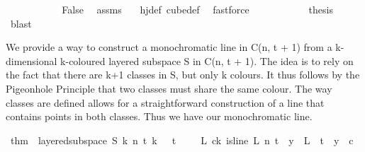 \begin{isabellebody}
\ \ \ \ \ \ \ \ \isamarkupfalse%
\ \isamarkupfalse%
\ False\ \isamarkupfalse%
\ assms\ {}\ \isamarkupfalse%
\ hj{\isacharunderscore}{\kern0pt}def\ cube{\isacharunderscore}{\kern0pt}def\ \isamarkupfalse%
\ fastforce\isanewline
\ \ \ \ \ \ \ \ \isamarkupfalse%
\ \isamarkupfalse%
\ {\isacharquery}{\kern0pt}thesis\ \isamarkupfalse%
\ blast\isanewline
\ \ \ \ \ \ \isamarkupfalse%
\isanewline
\isanewline
\ \ \ \ \isamarkupfalse%
\isanewline
\ \ \isamarkupfalse%
\isanewline
{}\isamarkupfalse%
%
\endisatagproof
{\isafoldproof}%
%
\isadelimproof
%
\endisadelimproof
%
\begin{isamarkuptext}%
We provide a way to construct a monochromatic line in C(n, t + 1) from a k-dimensional k-coloured layered subspace S in C(n, t + 1).
The idea is to rely on the fact that there are k+1 classes in S, but only k colours. It thus follows by the Pigeonhole Principle that two classes must share the same colour. The way classes are defined allows for a straightforward construction of a line that contains points in both classes. Thus we have our monochromatic line.%
\end{isamarkuptext}\isamarkuptrue%
\isamarkupfalse%
\ thm{}{\isacharcolon}{\kern0pt}\ \ {\isachardoublequoteopen}layered{\isacharunderscore}{\kern0pt}subspace\ S\ k\ n\ t\ k\ {\isasymchi}{\isachardoublequoteclose}\ \ {\isachardoublequoteopen}t\ {\isachargreater}{\kern0pt}\ {}{\isachardoublequoteclose}\ \ \ {\isachardoublequoteopen}{\isacharparenleft}{\kern0pt}{\isasymexists}L{\isachardot}{\kern0pt}\ {\isasymexists}c{\isacharless}{\kern0pt}k{\isachardot}{\kern0pt}\ is{\isacharunderscore}{\kern0pt}line\ L\ n\ {\isacharparenleft}{\kern0pt}t{\isacharplus}{\kern0pt}{}{\isacharparenright}{\kern0pt}\ {\isasymand}\ {\isacharparenleft}{\kern0pt}{\isasymforall}y\ {\isasymin}\ L\ {\isacharbackquote}{\kern0pt}\ {\isacharbraceleft}{\kern0pt}{\isachardot}{\kern0pt}{\isachardot}{\kern0pt}{\isacharless}{\kern0pt}t{\isacharplus}{\kern0pt}{}{\isacharbraceright}{\kern0pt}{\isachardot}{\kern0pt}\ {\isasymchi}\ y\ {\isacharequal}{\kern0pt}\ c{\isacharparenright}{\kern0pt}{\isacharparenright}{\kern0pt}{\isachardoublequoteclose}\isanewline
%
\isadelimproof
%
\endisadelimproof
%
\isatagproof
{}\isamarkupfalse%
{\isacharminus}{\kern0pt}\isanewline

\end{isabellebody}
